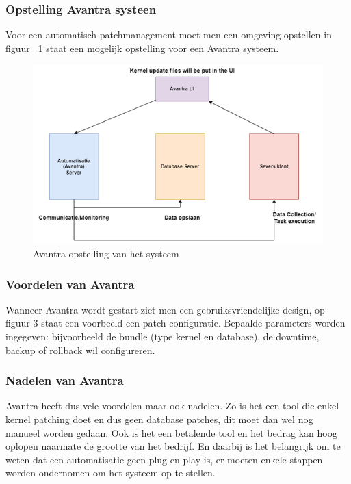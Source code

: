 \subsubsection{Opstelling Avantra systeen}
Voor een automatisch patchmanagement moet men een omgeving opstellen in figuur ~\ref{fig:avantra4} staat een mogelijk opstelling voor een Avantra systeem. 
\begin{figure}[h]
    \centering
    \includegraphics[width=\textwidth]{avantra4.png}
    \caption{Avantra opstelling van het systeem}
     \label{fig:avantra4}
\end{figure}
\newpage

\subsubsection{Voordelen van Avantra}
Wanneer Avantra wordt gestart ziet men een gebruiksvriendelijke design, op figuur 3 staat een voorbeeld een patch configuratie. Bepaalde parameters worden ingegeven: bijvoorbeeld de bundle (type kernel en database), de downtime, backup of 
 rollback wil configureren. \\ 

\subsubsection{Nadelen van Avantra}
Avantra heeft dus vele voordelen maar ook nadelen. Zo is het een tool die enkel kernel patching doet en dus geen database patches, dit moet dan wel nog manueel worden gedaan. Ook is het een betalende tool en het bedrag kan hoog oplopen naarmate de grootte van het bedrijf.
En daarbij is het belangrijk om te weten dat een automatisatie geen plug en play is, er moeten enkele stappen worden ondernomen om het systeem op te stellen.

